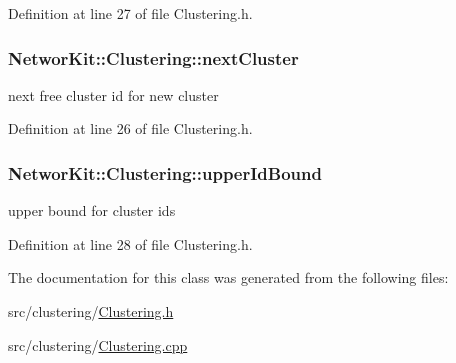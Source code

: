 Definition at line 27 of file Clustering.\-h.

\hypertarget{class_networ_kit_1_1_clustering_a3eca30f845e9803f20b92462fd6dc602}{
\subsubsection[{next\-Cluster}]{ Networ\-Kit\-::\-Clustering\-::next\-Cluster\hspace{0.3cm}{\ttfamily [protected]}}}\label{class_networ_kit_1_1_clustering_a3eca30f845e9803f20b92462fd6dc602}


next free cluster id for new cluster 



Definition at line 26 of file Clustering.\-h.

\hypertarget{class_networ_kit_1_1_clustering_a6fc3b70d463ec65ef29ca5520973d856}{
\subsubsection[{upper\-Id\-Bound}]{ Networ\-Kit\-::\-Clustering\-::upper\-Id\-Bound\hspace{0.3cm}{\ttfamily [protected]}}}\label{class_networ_kit_1_1_clustering_a6fc3b70d463ec65ef29ca5520973d856}


upper bound for cluster ids 



Definition at line 28 of file Clustering.\-h.



The documentation for this class was generated from the following files\-:\begin{DoxyCompactItemize}
\item 
src/clustering/\hyperlink{_clustering_8h}{Clustering.\-h}\item 
src/clustering/\hyperlink{_clustering_8cpp}{Clustering.\-cpp}\end{DoxyCompactItemize}
